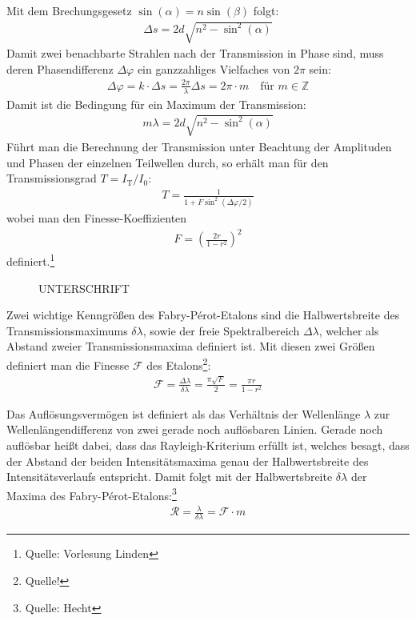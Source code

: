 \documentclass[11pt, a4paper]{article}
\begin{document}
Mit dem Brechungsgesetz $\sin(\alpha) = n \sin(\beta)$ folgt:
\begin{align}
	\Delta s = 2 d \sqrt{n^2 - \sin^2(\alpha)}
\end{align}
Damit zwei benachbarte Strahlen nach der Transmission in Phase sind, muss deren Phasendifferenz $\Delta \varphi$ ein ganzzahliges Vielfaches von $2\pi$ sein:
\begin{align}
	\Delta \varphi = k \cdot \Delta s = \frac{2\pi}{\lambda} \Delta s = 2 \pi \cdot m \quad \text{für } m \in \mathbb{Z}
\end{align}
Damit ist die Bedingung für ein Maximum der Transmission:
\begin{align}
	m \lambda = 2 d \sqrt{n^2 - \sin^2(\alpha)}
	\label{eq:interferenzbedingung}
\end{align}
Führt man die Berechnung der Transmission unter Beachtung der Amplituden und Phasen der einzelnen Teilwellen durch, so erhält man für den Transmissionsgrad $T = I_\mathrm{T} / I_0$:
\begin{align}
	T = \frac{1}{1 + F \sin^2(\Delta \varphi / 2)}
\end{align}
wobei man den Finesse-Koeffizienten
\begin{align}
	F = \left( \frac{2 r}{1 - r^2} \right)^2
\end{align}
definiert.\footnote{Quelle: Vorlesung Linden}

\begin{figure}[h]
	\centering
	
	\caption{UNTERSCHRIFT}
	\label{fig:fabry_transmission}
\end{figure}

Zwei wichtige Kenngrößen des Fabry-Pérot-Etalons sind die Halbwertsbreite des Transmissionsmaximums $\delta \lambda$, sowie der freie Spektralbereich $\Delta \lambda$, welcher als Abstand zweier Transmissionsmaxima definiert ist.
Mit diesen zwei Größen definiert man die Finesse $\mathcal{F}$ des Etalons\footnote{Quelle!}:
\begin{align}
	\mathcal{F} = \frac{\Delta \lambda}{\delta \lambda} = \frac{\pi \sqrt{F}}{2} = \frac{\pi r}{1 - r^2}
\end{align}

Das Auflösungsvermögen ist definiert als das Verhältnis der Wellenlänge $\lambda$ zur Wellenlängendifferenz von zwei gerade noch auflösbaren Linien.
Gerade noch auflösbar heißt dabei, dass das Rayleigh-Kriterium erfüllt ist, welches besagt, dass der Abstand der beiden Intensitätsmaxima genau der Halbwertsbreite des Intensitätsverlaufs entspricht.
Damit folgt mit der Halbwertsbreite $\delta \lambda$ der Maxima des Fabry-Pérot-Etalons:\footnote{Quelle: Hecht}
\begin{align}
	\mathcal{R} = \frac{\lambda}{\delta \lambda} = \mathcal{F} \cdot m
\end{align}
\end{document}
